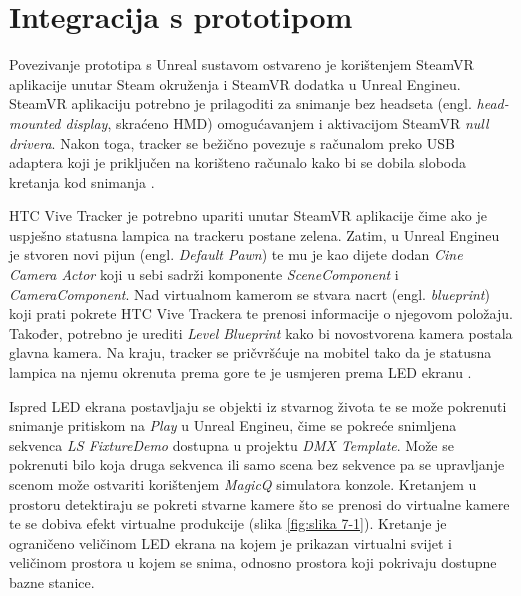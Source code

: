 \documentclass[times, utf8, zavrsni, numeric]{fer}
\begin{document}
\chapter{Integracija s prototipom}
Povezivanje prototipa s Unreal sustavom ostvareno je korištenjem SteamVR aplikacije unutar Steam okruženja i SteamVR dodatka u Unreal Engineu. SteamVR aplikaciju potrebno je prilagoditi za snimanje bez headseta (engl. \emph{head-mounted display}, skraćeno HMD) omogućavanjem i aktivacijom SteamVR \emph{null drivera}. Nakon toga, tracker se bežično povezuje s računalom preko USB adaptera koji je priključen na korišteno računalo kako bi se dobila sloboda kretanja kod snimanja \cite{vp}. \newline

HTC Vive Tracker je potrebno upariti unutar SteamVR aplikacije čime ako je uspješno statusna lampica na trackeru postane zelena. Zatim, u Unreal Engineu je stvoren novi pijun (engl. \emph{Default Pawn}) te mu je kao dijete dodan \emph{Cine Camera Actor} koji u sebi sadrži komponente \emph{SceneComponent} i \emph{CameraComponent}. Nad virtualnom kamerom se stvara nacrt (engl. \emph{blueprint}) koji prati pokrete HTC Vive Trackera te prenosi informacije o njegovom položaju. Također, potrebno je urediti \emph{Level Blueprint} kako bi novostvorena kamera postala glavna kamera. Na kraju, tracker se pričvršćuje na mobitel tako da je statusna lampica na njemu okrenuta prema gore te je usmjeren prema LED ekranu \cite{vp}. \newline

Ispred LED ekrana postavljaju se objekti iz stvarnog života te se može pokrenuti snimanje pritiskom na \emph{Play} u Unreal Engineu, čime se pokreće snimljena sekvenca \emph{LS FixtureDemo} dostupna u projektu \emph{DMX Template}. Može se pokrenuti bilo koja druga sekvenca ili samo scena bez sekvence pa se upravljanje scenom može ostvariti korištenjem \emph{MagicQ} simulatora konzole. Kretanjem u prostoru detektiraju se pokreti stvarne kamere što se prenosi do virtualne kamere te se dobiva efekt virtualne produkcije (slika \ref{fig:slika 7-1}). Kretanje je ograničeno veličinom LED ekrana na kojem je prikazan virtualni svijet i veličinom prostora u kojem se snima, odnosno prostora koji pokrivaju dostupne bazne stanice.
\end{document}
